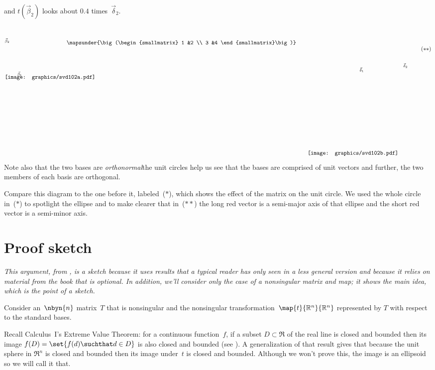 and $t(\vec{\beta}_2)$ looks about $0.4$ times~$\vec{\delta}_2$. 
\begin{equation*}
  \setlength{\unitlength}{1in}
  \begin{picture}(1.35,1.35)
    \put(0,1.825){\texttt{[image: graphics/svd102a.pdf]}}
    \put(.3,1.9){\scriptsize $\vec{\beta}_1$}
    \put(0,2.7){\scriptsize $\vec{\beta}_2$}
  \end{picture}
  \quad
  \raisebox{2.65in}{$\mapsunder{\big (\begin{smallmatrix} 1 &2 \\ 3 &4 \end{smallmatrix}\big )}$}
  \qquad
  \begin{picture}(2.45,3.15)
    \put(0,0){\texttt{[image: graphics/svd102b.pdf]}}
    \put(1.25,2){\scriptsize $\vec{\delta}_1$}
    \put(2.3,2.1){\scriptsize $\vec{\delta}_2$}
  \end{picture}
  \tag*{\raisebox{2.5in}{($**$)}}
\end{equation*}
Note also that the two bases are \textit{orthonormal}\Dash the unit circles help
us see that the bases are comprised of unit vectors and further,
the two members of each basis are orthogonal.

Compare this diagram to the one before it, 
labeled~($*$), which shows the effect of the matrix
on the unit circle.
We used the whole circle in~($*$) to spotlight the ellipse and 
to make clearer that in~($**$)
the long red vector is a
semi-major axis of that ellipse and the short red vector is a 
semi-minor axis.



\section{Proof sketch}

\textit{This argument, 
from \cite{BlankKrikorianSpring89},
is a sketch because it uses results that a typical reader has only 
seen in a less general version and because it relies on material from the
book that is optional.
In addition, we'll consider only the case of a nonsingular matrix and map;
it shows the main idea, which is the point of a sketch.}

Consider an~$\nbyn{n}$ matrix~$T$ that is nonsingular and the
nonsingular transformation~$\map{t}{\Re^n}{\Re^n}$ represented by
$T$ with respect to the standard bases.

Recall Calculus~I's Extreme Value Theorem: for a continuous
function~$f$, if a subset $D\subset \Re$ of the real line 
is closed and bounded then
its image $f(D)=\set{f(d)\suchthat d\in D}$ 
is also closed and bounded (see \cite{wiki:ExtremeValueThm}).
A generalization of that result gives that because the unit sphere in $\Re^n$
is closed and bounded then its image under~$t$ is closed and bounded.
Although we won't prove this, the image is an ellipsoid
so we will call it that. 

